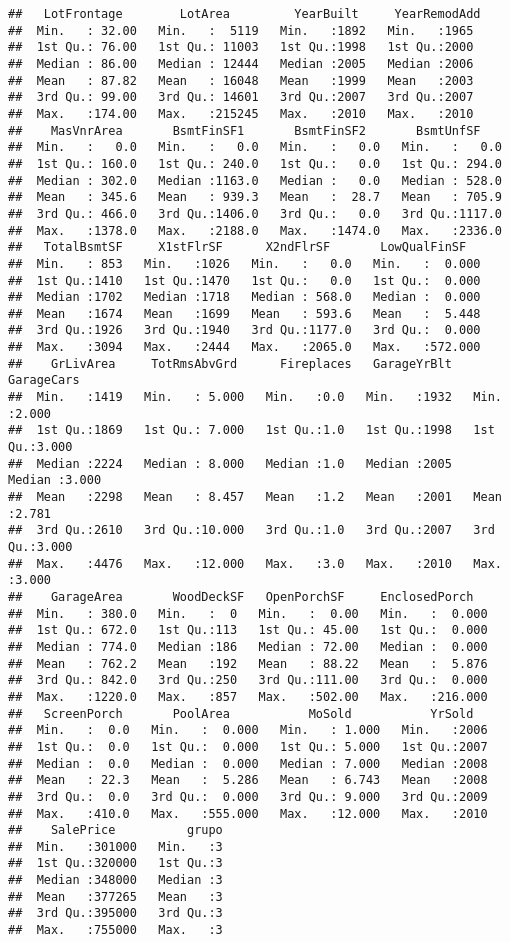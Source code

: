 \documentclass[
]{article}
\begin{document}
\begin{verbatim}
##   LotFrontage        LotArea         YearBuilt     YearRemodAdd 
##  Min.   : 32.00   Min.   :  5119   Min.   :1892   Min.   :1965  
##  1st Qu.: 76.00   1st Qu.: 11003   1st Qu.:1998   1st Qu.:2000  
##  Median : 86.00   Median : 12444   Median :2005   Median :2006  
##  Mean   : 87.82   Mean   : 16048   Mean   :1999   Mean   :2003  
##  3rd Qu.: 99.00   3rd Qu.: 14601   3rd Qu.:2007   3rd Qu.:2007  
##  Max.   :174.00   Max.   :215245   Max.   :2010   Max.   :2010  
##    MasVnrArea       BsmtFinSF1       BsmtFinSF2       BsmtUnfSF     
##  Min.   :   0.0   Min.   :   0.0   Min.   :   0.0   Min.   :   0.0  
##  1st Qu.: 160.0   1st Qu.: 240.0   1st Qu.:   0.0   1st Qu.: 294.0  
##  Median : 302.0   Median :1163.0   Median :   0.0   Median : 528.0  
##  Mean   : 345.6   Mean   : 939.3   Mean   :  28.7   Mean   : 705.9  
##  3rd Qu.: 466.0   3rd Qu.:1406.0   3rd Qu.:   0.0   3rd Qu.:1117.0  
##  Max.   :1378.0   Max.   :2188.0   Max.   :1474.0   Max.   :2336.0  
##   TotalBsmtSF     X1stFlrSF      X2ndFlrSF       LowQualFinSF    
##  Min.   : 853   Min.   :1026   Min.   :   0.0   Min.   :  0.000  
##  1st Qu.:1410   1st Qu.:1470   1st Qu.:   0.0   1st Qu.:  0.000  
##  Median :1702   Median :1718   Median : 568.0   Median :  0.000  
##  Mean   :1674   Mean   :1699   Mean   : 593.6   Mean   :  5.448  
##  3rd Qu.:1926   3rd Qu.:1940   3rd Qu.:1177.0   3rd Qu.:  0.000  
##  Max.   :3094   Max.   :2444   Max.   :2065.0   Max.   :572.000  
##    GrLivArea     TotRmsAbvGrd      Fireplaces   GarageYrBlt     GarageCars   
##  Min.   :1419   Min.   : 5.000   Min.   :0.0   Min.   :1932   Min.   :2.000  
##  1st Qu.:1869   1st Qu.: 7.000   1st Qu.:1.0   1st Qu.:1998   1st Qu.:3.000  
##  Median :2224   Median : 8.000   Median :1.0   Median :2005   Median :3.000  
##  Mean   :2298   Mean   : 8.457   Mean   :1.2   Mean   :2001   Mean   :2.781  
##  3rd Qu.:2610   3rd Qu.:10.000   3rd Qu.:1.0   3rd Qu.:2007   3rd Qu.:3.000  
##  Max.   :4476   Max.   :12.000   Max.   :3.0   Max.   :2010   Max.   :3.000  
##    GarageArea       WoodDeckSF   OpenPorchSF     EnclosedPorch    
##  Min.   : 380.0   Min.   :  0   Min.   :  0.00   Min.   :  0.000  
##  1st Qu.: 672.0   1st Qu.:113   1st Qu.: 45.00   1st Qu.:  0.000  
##  Median : 774.0   Median :186   Median : 72.00   Median :  0.000  
##  Mean   : 762.2   Mean   :192   Mean   : 88.22   Mean   :  5.876  
##  3rd Qu.: 842.0   3rd Qu.:250   3rd Qu.:111.00   3rd Qu.:  0.000  
##  Max.   :1220.0   Max.   :857   Max.   :502.00   Max.   :216.000  
##   ScreenPorch       PoolArea           MoSold           YrSold    
##  Min.   :  0.0   Min.   :  0.000   Min.   : 1.000   Min.   :2006  
##  1st Qu.:  0.0   1st Qu.:  0.000   1st Qu.: 5.000   1st Qu.:2007  
##  Median :  0.0   Median :  0.000   Median : 7.000   Median :2008  
##  Mean   : 22.3   Mean   :  5.286   Mean   : 6.743   Mean   :2008  
##  3rd Qu.:  0.0   3rd Qu.:  0.000   3rd Qu.: 9.000   3rd Qu.:2009  
##  Max.   :410.0   Max.   :555.000   Max.   :12.000   Max.   :2010  
##    SalePrice          grupo  
##  Min.   :301000   Min.   :3  
##  1st Qu.:320000   1st Qu.:3  
##  Median :348000   Median :3  
##  Mean   :377265   Mean   :3  
##  3rd Qu.:395000   3rd Qu.:3  
##  Max.   :755000   Max.   :3
\end{verbatim}
\end{document}
